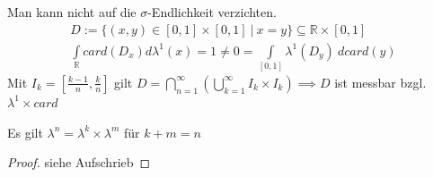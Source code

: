   \begin{example}
    Man kann nicht auf die $\sigma$-Endlichkeit verzichten.
    \begin{align*}
      D := \{(x,y) \in [0,1] \times [0,1] \ | \ x=y\} \subseteq \mathbb{R} \times [0,1]\\
      \int\limits_{\mathbb{R}} card(D_x) d\lambda^1(x) = 1 \neq 0 = \int\limits_{[0,1]} \lambda^1(D_y) \ d card(y)
    \end{align*}
    Mit $I_k = [\frac{k-1}{n}, \frac{k}{n}]$ gilt $D = \bigcap\limits_{n=1}^{\infty}( \bigcup\limits_{k=1}^{\infty} I_k \times I_k) \implies D$ ist messbar bzgl. $\lambda^1 \times card$
  \end{example}

  \newpage
  \begin{lemma}
    Es gilt $\lambda^n = \lambda^k \times \lambda^m$ für $k + m = n$
  \end{lemma}
  \begin{proof}
    siehe Aufschrieb
  \end{proof}

